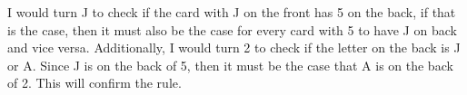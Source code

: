 \documentclass[a4paper]{exam}
\begin{document}
\begin{questions}
  \begin{solution}
    
    I would turn J to check if the card with J on the front has 5 on the back, if that is the case, then it must also be the case for every card with 5 to have J on back and vice versa.
    Additionally, I would turn 2 to check if the letter on the back is J or A. Since J is on the back of 5, then it must be the case that A is on the back of 2. This will confirm the rule.
  \end{solution}

  
\end{questions}
\end{document}
